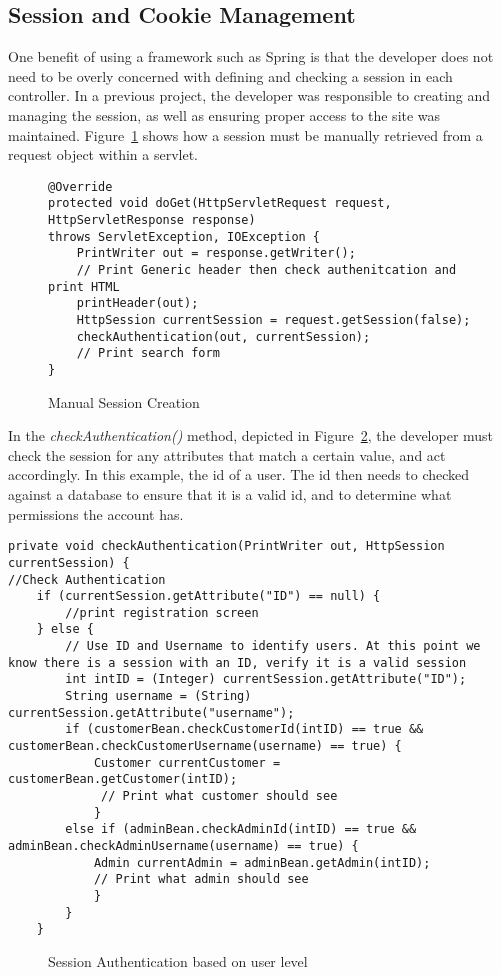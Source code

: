 \subsection{Session and Cookie Management}
One benefit of using a framework such as Spring is that the developer does not need to be overly concerned with defining and checking a session in each controller. In a previous project, the developer was responsible to creating and managing the session, as well as ensuring proper access to the site was maintained. Figure~\ref{fig:manualsession} shows how a session must be manually retrieved from a request object within a servlet.

\begin{figure}[H]
\begin{lstlisting}
@Override
protected void doGet(HttpServletRequest request, HttpServletResponse response)
throws ServletException, IOException {
    PrintWriter out = response.getWriter();
    // Print Generic header then check authenitcation and print HTML
    printHeader(out);
    HttpSession currentSession = request.getSession(false);
    checkAuthentication(out, currentSession);
    // Print search form
}
\end{lstlisting}
\caption{Manual Session Creation}
\label{fig:manualsession}
\end{figure}

In the \textit{checkAuthentication()} method, depicted in Figure~\ref{fig:sessionlevel}, the developer must check the session for any attributes that match a certain value, and act accordingly. In this example, the id of a user. The id then needs to checked against a database to ensure that it is a valid id, and to determine what permissions the account has.


\begin{lstlisting}
private void checkAuthentication(PrintWriter out, HttpSession currentSession) {
//Check Authentication
	if (currentSession.getAttribute("ID") == null) {
		//print registration screen
    } else {
        // Use ID and Username to identify users. At this point we know there is a session with an ID, verify it is a valid session
        int intID = (Integer) currentSession.getAttribute("ID");
        String username = (String) currentSession.getAttribute("username");
        if (customerBean.checkCustomerId(intID) == true && customerBean.checkCustomerUsername(username) == true) {
			Customer currentCustomer = customerBean.getCustomer(intID);
			 // Print what customer should see
            } 
		else if (adminBean.checkAdminId(intID) == true && adminBean.checkAdminUsername(username) == true) {
            Admin currentAdmin = adminBean.getAdmin(intID);
			// Print what admin should see   
            }
        }
	}
\end{lstlisting}
\begin{figure}[H]
\caption{Session Authentication based on user level}
\label{fig:sessionlevel}
\end{figure}

